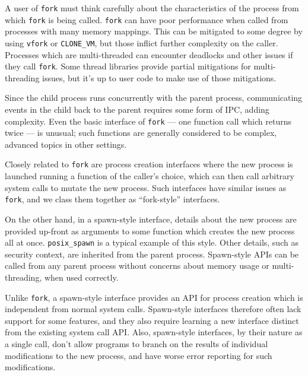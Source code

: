 \documentclass[letterpaper,twocolumn,10pt]{article}
\begin{document}
A user of \texttt{fork} must think carefully about the characteristics of the process
from which \texttt{fork} is being called.
\texttt{fork} can have poor performance when called from processes with many memory mappings.\cite{forkroad}
This can be mitigated to some degree by using \texttt{vfork} or \texttt{CLONE\_VM},
but those inflict further complexity on the caller.\cite{vfork_dangerous}
Processes which are multi-threaded can encounter deadlocks and other issues if they call \texttt{fork}.
\cite{forkroad}\cite{tlpi}\cite{posix_spawn_error_pipe}
Some thread libraries provide partial mitigations for multi-threading issues,
but it's up to user code to make use of those mitigations.\cite{pthread_atfork}

Since the child process runs concurrently with the parent process,
communicating events in the child back to the parent requires some form of IPC,
adding complexity.\cite{posix_spawn_error_pipe}
Even the basic interface of \texttt{fork} --- one function call which returns twice --- is unusual;
such functions are generally considered to be complex, advanced topics in other settings.
\cite{callcc_fork}\cite{continuations}

Closely related to \texttt{fork}
are process creation interfaces where the new process is launched running a function of the caller's choice,
which can then call arbitrary system calls to mutate the new process.
\cite{clone}\cite{sfork}
Such interfaces have similar issues as \texttt{fork},
and we class them together as ``fork-style'' interfaces.

On the other hand, in a spawn-style interface,
details about the new process are provided up-front as arguments to some function
which creates the new process all at once.
\texttt{posix\_spawn} is a typical example of this style.\cite{posix_spawn}\cite{create_process}\cite{chainloading}
Other details, such as security context, are inherited from the parent process.\cite{tlpi}\cite{create_process}
Spawn-style APIs
can be called from any parent process without concerns about memory usage or multi-threading,
when used correctly.
\cite{forkroad}\cite{posix_spawn_error_pipe}

Unlike \texttt{fork}, a spawn-style interface provides an API for process creation
which is independent from normal system calls.\cite{spawn_h}\cite{subprocess_run}
Spawn-style interfaces therefore often lack support for some features,
and they also require learning a new interface distinct from the existing system call API.\cite{tlpi}\cite{posix_spawn_lwn}
Also, spawn-style interfaces, by their nature as a single call,
don't allow programs to branch on the results of individual modifications to the new process,
and have worse error reporting for such modifications.
\cite{posix_spawn}\cite{posix_spawn_error_pipe}
\end{document}
